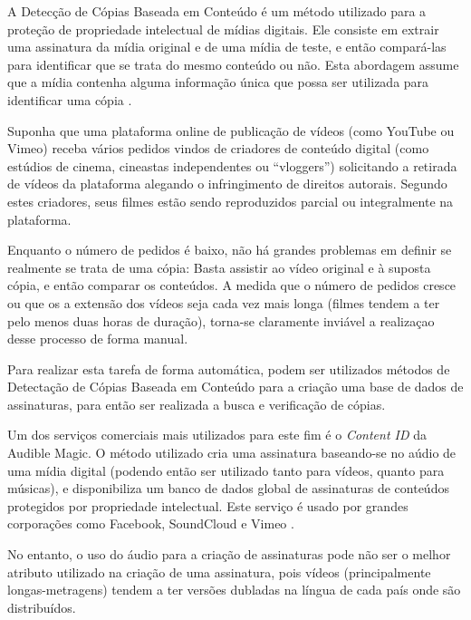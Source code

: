 A Detecção de Cópias Baseada em Conteúdo é um método utilizado para a proteção de propriedade intelectual de mídias digitais. Ele consiste em extrair uma assinatura da mídia original e de uma mídia de teste, e então compará-las para identificar que se trata do mesmo conteúdo ou não. Esta abordagem assume que a mídia contenha alguma informação única que possa ser utilizada para identificar uma cópia \citeauthor{kim2005spatiotemporal}. 

Suponha que uma plataforma online de publicação de vídeos (como YouTube ou Vimeo) receba vários pedidos vindos de criadores de conteúdo digital (como estúdios de cinema, cineastas independentes ou ``vloggers'') solicitando a retirada de vídeos da plataforma alegando o infringimento de direitos autorais. Segundo estes criadores, seus filmes estão sendo reproduzidos parcial ou integralmente na plataforma. 

Enquanto o número de pedidos é baixo, não há grandes problemas em definir se realmente se trata de uma cópia: Basta assistir ao vídeo original e à suposta cópia, e então comparar os conteúdos. A medida que o número de pedidos cresce ou que os a extensão dos vídeos seja cada vez mais longa (filmes tendem a ter pelo menos duas horas de duração), torna-se claramente inviável a realizaçao desse processo de forma manual.


Para realizar esta tarefa de forma automática, podem ser utilizados métodos de Detectação de Cópias Baseada em Conteúdo para a criação uma base de dados de assinaturas, para então ser realizada a busca e verificação de cópias.

Um dos serviços comerciais mais utilizados para este fim é o \textit{Content ID} da Audible Magic. O método utilizado cria uma assinatura baseando-se no aúdio de uma mídia digital (podendo então ser utilizado tanto para vídeos, quanto para músicas), e disponibiliza um banco de dados global de assinaturas de conteúdos protegidos por propriedade intelectual. Este serviço é usado por grandes corporações como Facebook, SoundCloud e Vimeo \citeauthor{audiblemagic}.

No entanto, o uso do áudio para a criação de assinaturas pode não ser o melhor atributo utilizado na criação de uma assinatura, pois vídeos (principalmente longas-metragens) tendem a ter versões dubladas na língua de cada país onde são distribuídos. 

